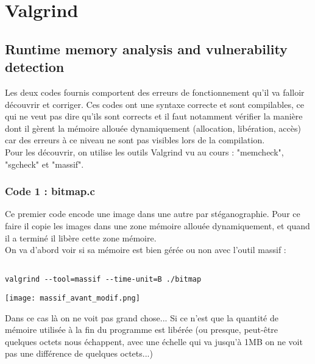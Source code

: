 
\chapter{Valgrind} %

\label{Chapitre 4.1} %




\section{Runtime memory analysis and vulnerability detection}
Les deux codes fournis comportent des erreurs de fonctionnement qu'il va falloir découvrir et corriger. Ces codes ont une syntaxe correcte et sont compilables, ce qui ne veut pas dire qu'ils sont corrects et il faut notamment vérifier la manière dont il gèrent la mémoire allouée dynamiquement (allocation, libération, accès) car des erreurs à ce niveau ne sont pas visibles lors de la compilation.\\
Pour les découvrir, on utilise les outils Valgrind vu au cours : "memcheck", "sgcheck" et "massif".

\subsection{Code 1 : bitmap.c}
Ce premier code encode une image dans une autre par stéganographie. Pour ce faire il copie les images dans une zone mémoire allouée dynamiquement, et quand il a terminé il libère cette zone mémoire.\\

On va d'abord voir si sa mémoire est bien gérée ou non avec l'outil massif :
\begin{lstlisting}[frame=single,style=Console]  % Start your code-block

valgrind --tool=massif --time-unit=B ./bitmap
\end{lstlisting}

\begin{center} 
\hspace{15cm}
\texttt{[image: massif\_avant\_modif.png]}
\end{center}
\vspace{0.5cm}
Dans ce cas là on ne voit pas grand chose... Si ce n'est que la quantité de mémoire utilisée à la fin du programme est libérée (ou presque, peut-être quelques octets nous échappent, avec une échelle qui va jusqu'à 1MB on ne voit pas une différence de quelques octets...)\\

